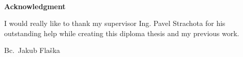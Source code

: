 \documentclass[a4paper,12pt]{report}	%
\newcommand{\autor}{Bc.~Jakub Flaška}
\begin{document}
~
\vfill %

{\bf Acknowledgment}

\vspace{5mm} %
I would really like to thank my supervisor Ing. Pavel Strachota for his outstanding help while creating this diploma thesis and my previous work.

\begin{flushright}
\autor
\end{flushright}

\newpage
\tableofcontents








%


\nocite{*}				%





\end{document}
